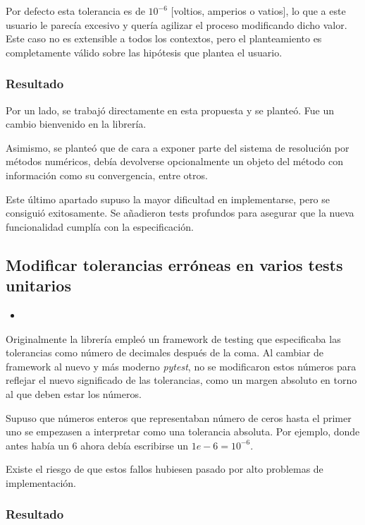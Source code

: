 Por defecto esta tolerancia es de $10^{-6}$ [voltios, amperios o vatios], lo que a este usuario le parecía excesivo y quería agilizar el proceso modificando dicho valor. Este caso no es extensible a todos los contextos, pero el planteamiento es completamente válido sobre las hipótesis que plantea el usuario.

\subsubsection{Resultado}

Por un lado, se trabajó directamente en esta propuesta y se planteó. Fue un cambio bienvenido en la librería.

Asimismo, se planteó que de cara a exponer parte del sistema de resolución por métodos numéricos, debía devolverse opcionalmente un objeto del método con información como su convergencia, entre otros.

Este último apartado supuso la mayor dificultad en implementarse, pero se consiguió exitosamente. Se añadieron tests profundos para asegurar que la nueva funcionalidad cumplía con la especificación.

\subsection{Modificar tolerancias erróneas en varios tests unitarios}

\begin{itemize}
    \item {}
\end{itemize}

Originalmente la librería empleó un \gls{framework} de testing que especificaba las tolerancias como número de decimales después de la coma. Al cambiar de framework al nuevo y más moderno \textit{pytest}, no se modificaron estos números para reflejar el nuevo significado de las tolerancias, como un margen absoluto en torno al que deben estar los números.

Supuso que números enteros que representaban número de ceros hasta el primer uno se empezasen a interpretar como una tolerancia absoluta. Por ejemplo, donde antes había un $6$ ahora debía escribirse un $1e-6 = 10^{-6}$.

Existe el riesgo de que estos fallos hubiesen pasado por alto problemas de implementación.

\subsubsection{Resultado}

